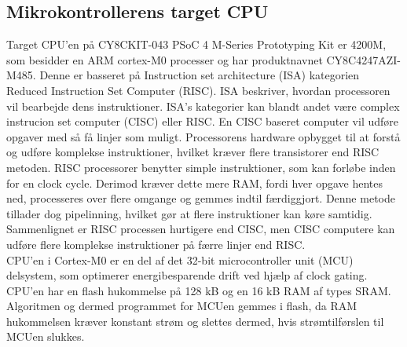 \subsection{Mikrokontrollerens target CPU}
Target CPU'en på CY8CKIT-043 PSoC 4 M-Series Prototyping Kit er 4200M, som besidder en ARM cortex-M0 processer og har produktnavnet CY8C4247AZI-M485. Denne er basseret på Instruction set architecture (ISA) kategorien Reduced Instruction Set Computer (RISC). ISA beskriver, hvordan processoren vil bearbejde dens instruktioner. ISA's kategorier kan blandt andet være complex instrucion set computer (CISC) eller RISC. En CISC baseret computer vil udføre opgaver med så få linjer som muligt. Processorens hardware opbygget til at forstå og udføre komplekse instruktioner, hvilket kræver flere transistorer end RISC metoden. RISC processorer benytter simple instruktioner, som kan forløbe inden for en clock cycle. Derimod kræver dette mere RAM, fordi hver opgave hentes ned, processeres over flere omgange og gemmes indtil færdiggjort. Denne metode tillader dog pipelinning, hvilket gør at flere instruktioner kan køre samtidig. Sammenlignet er RISC processen hurtigere end CISC, men CISC computere kan udføre flere komplekse instruktioner på færre linjer end RISC. \citep{CYPRESS2016Cortexm0,Semiconductor20164200M,Yadav2016}\\
CPU'en i Cortex-M0 er en del af det 32-bit microcontroller unit (MCU) delsystem, som optimerer energibesparende drift ved hjælp af clock gating. %
CPU'en har en flash hukommelse på 128 kB og en 16 kB RAM af types SRAM. Algoritmen og dermed programmet for MCUen gemmes i flash, da RAM hukommelsen kræver konstant strøm og slettes dermed, hvis strømtilførslen til MCUen slukkes. \citep{Semiconductor20164200M}
%

